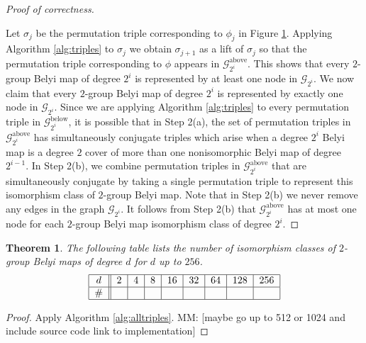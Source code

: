 \documentclass{dcthesis}
\newcommand{\mm}[1]{{\color{blue} \sf MM: [#1]}}
\newtheorem{theorem}[prop]{Theorem}
\theoremstyle{definition}
\theoremstyle{remark}
\numberwithin{equation}{section}
\numberwithin{figure}{section}
\begin{document}
{{\begin{proof}[Proof of correctness]
\begin{figure}[ht]
{        }
        \label{fig:2groupfiltration}
      \end{figure}
      Let $\sigma_j$ be the permutation triple corresponding to
      $\phi_j$ in Figure \ref{fig:2groupfiltration}.
      Applying Algorithm \ref{alg:triples} to $\sigma_j$
      we obtain $\sigma_{j+1}$ as a lift of $\sigma_j$
      so that the permutation triple corresponding to $\phi$
      appears in $\mathscr{G}_{2^i}^\text{above}$.
      This shows that every $2$-group Belyi map
      of degree $2^i$ is represented by at least one node in
      $\mathscr{G}_{2^i}$.
      We now claim that every $2$-group Belyi map of degree $2^i$
      is represented by exactly one node in $\mathscr{G}_{2^i}$.
      Since we are applying Algorithm \ref{alg:triples}
      to every permutation triple in $\mathscr{G}_{2^i}^\text{below}$,
      it is possible that in Step 2(a),
      the set of permutation triples in $\mathscr{G}_{2^i}^\text{above}$
      has simultaneously conjugate triples
      which arise when a degree $2^i$ Belyi map
      is a degree $2$ cover of more than one
      nonisomorphic Belyi map of degree $2^{i-1}$.
      In Step 2(b),
      we combine permutation triples in $\mathscr{G}_{2^i}^\text{above}$
      that are simultaneously conjugate by taking a single
      permutation triple to represent this isomorphism class
      of $2$-group Belyi map.
      Note that in Step 2(b)
      we never remove any edges in the graph
      $\mathscr{G}_{2^i}$.
      It follows from Step 2(b)
      that $\mathscr{G}_{2^i}^\text{above}$ has at most
      one node for each
      $2$-group Belyi map
      isomorphism class of degree $2^i$.
    \end{proof}
    \begin{theorem}\label{thm:isoclasses}
      The following table lists the number of isomorphism classes of
      $2$-group Belyi maps of degree $d$ for $d$ up to $256$.
      \[
        \begin{tabular}{|c||c|c|c|c|c|c|c|c|}
          \hline
          $d$ & $2$ & $4$ & $8$ & $16$ & $32$ & $64$ & $128$ & $256$\\
          \hline
          \# & $$ & $$ & $$ & $$ & $$ & $$ & $$ & $$\\
          \hline
        \end{tabular}
      \]
    \end{theorem}
    \begin{proof}
      Apply Algorithm \ref{alg:alltriples}.
      \mm{maybe go up to 512 or 1024 and include source code link to implementation}

\end{proof}}}
\end{document}
